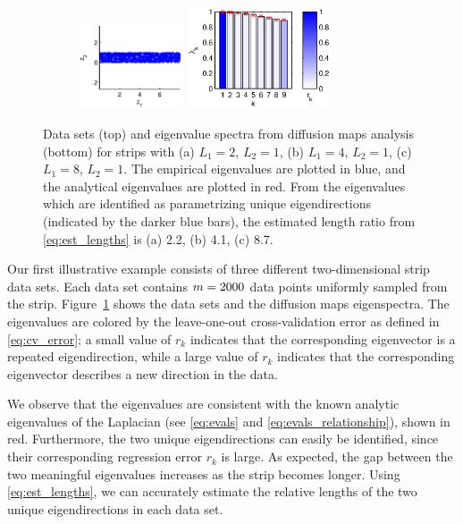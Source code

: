 \begin{figure}[!t]
%
%
\begin{subfigure}{0.3\textwidth}
\includegraphics[height=2.5cm]{strip_data_L8}
\includegraphics[height=3cm]{strip_spectrum_L8}
\caption{}
\end{subfigure}
%
\caption{Data sets (top) and eigenvalue spectra from diffusion maps analysis (bottom) for strips with (a) $L_1 = 2$, $L_2 = 1$, (b) $L_1 = 4$, $L_2 = 1$, (c) $L_1 = 8$, $L_2 = 1$. The empirical eigenvalues are plotted in blue, and the analytical eigenvalues are plotted in red. From the eigenvalues which are identified as parametrizing unique eigendirections (indicated by the darker blue bars), the estimated length ratio from \eqref{eq:est_lengths} is (a) 2.2, (b) 4.1, (c) 8.7.}
\label{fig:strip_compare_analytic}
\end{figure}

Our first illustrative example consists of three different two-dimensional strip data sets.
%
Each data set contains $m=2000$ data points uniformly sampled from the strip.
%
Figure~\ref{fig:strip_compare_analytic} shows the data sets and the diffusion maps eigenspectra.
%
The eigenvalues are colored by the leave-one-out cross-validation error as defined in \eqref{eq:cv_error}; a small value of $r_k$ indicates that the corresponding eigenvector is a repeated eigendirection, while a large value of $r_k$ indicates that the corresponding eigenvector describes a new direction in the data.
%

We observe that the eigenvalues are consistent with the known analytic eigenvalues of the Laplacian (see \eqref{eq:evals} and \eqref{eq:evals_relationship}), shown in red.
%
Furthermore, the two unique eigendirections can easily be identified, since their corresponding regression error $r_k$ is large.
%
As expected, the gap between the two meaningful eigenvalues increases as the strip becomes longer.
%
Using \eqref{eq:est_lengths}, we can accurately estimate the relative lengths of the two unique eigendirections in each data set.



